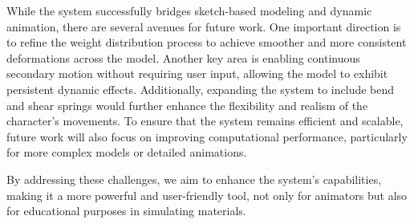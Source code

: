 \documentclass{report}
\begin{document}
While the system successfully bridges sketch-based modeling and dynamic animation, there are several avenues for future work. One important direction is to refine the weight distribution process to achieve smoother and more consistent deformations across the model. Another key area is enabling continuous secondary motion without requiring user input, allowing the model to exhibit persistent dynamic effects. Additionally, expanding the system to include bend and shear springs would further enhance the flexibility and realism of the character’s movements. To ensure that the system remains efficient and scalable, future work will also focus on improving computational performance, particularly for more complex models or detailed animations.

By addressing these challenges, we aim to enhance the system’s capabilities, making it a more powerful and user-friendly tool, not only for animators but also for educational purposes in simulating materials.


\newpage
\renewcommand{\bibname}{References} 

\end{document}
